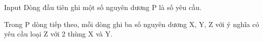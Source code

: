 Input
Dòng đầu tiên ghi một số nguyên dương P là số yêu cầu.  

   Trong P dòng tiếp theo, mỗi dòng ghi ba số nguyên dương X, Y, Z với ý nghĩa có yêu cầu loại Z với 2 thùng X và Y.